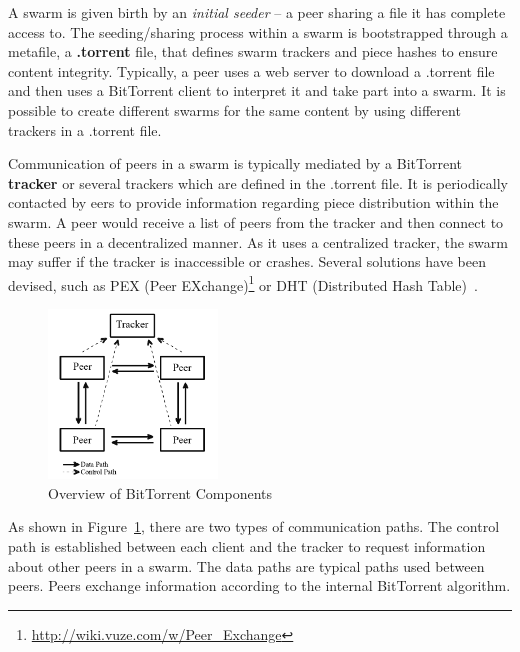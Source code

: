 A swarm is given birth by an \textit{initial seeder} -- a peer sharing
a file it has complete access to. The seeding/sharing process within a swarm
is bootstrapped through a metafile, a \textbf{.torrent} file, that defines swarm
trackers and piece hashes to ensure content integrity. Typically, a peer uses
a web server to download a .torrent file and then uses a BitTorrent client to
interpret it and take part into a swarm. It is possible to create different
swarms for the same content by using different trackers in a .torrent file.

Communication of peers in a swarm is typically mediated by a BitTorrent
\textbf{tracker} or several trackers which are defined in the .torrent file.
It is periodically contacted by eers to provide information regarding
piece distribution within the swarm. A peer would receive a list of peers from
the tracker and then connect to these peers in a decentralized manner. As it
uses a centralized tracker, the swarm may suffer if the tracker is
inaccessible or crashes. Several solutions have been devised, such as PEX
(Peer EXchange)\footnote{\url{http://wiki.vuze.com/w/Peer\_Exchange}} or DHT (Distributed Hash Table)~\cite{dht-paper}.

\begin{figure}[htb]
  \begin{center}
    \includegraphics[width=0.4\textwidth]{src/img/p2p-systems/bittorrent-overview}
  \end{center}
  \caption{Overview of BitTorrent Components}
  \label{fig:p2p-systems:bittorrent-overview}
\end{figure}

As shown in Figure~\ref{fig:p2p-systems:bittorrent-overview}, there are two
types of communication paths. The control path is established between each
client and the tracker to request information about other peers in a swarm.
The data paths are typical paths used between peers. Peers exchange
information according to the internal BitTorrent algorithm.

